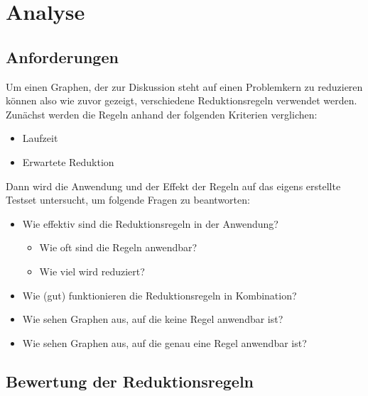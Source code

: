 
\chapter{Analyse}
\label{ch:Analyse}




\section{Anforderungen}
\label{ch:Analyse:sec:Anforderungen}

Um einen Graphen, der zur Diskussion steht auf einen Problemkern zu reduzieren können also wie zuvor gezeigt, verschiedene Reduktionsregeln verwendet werden. \\
Zunächst werden die Regeln anhand der folgenden Kriterien verglichen:
\begin{itemize}
	\item Laufzeit
	\item Erwartete Reduktion
\end{itemize}
Dann wird die Anwendung und der Effekt der Regeln auf das eigens erstellte Testset untersucht, um folgende Fragen zu beantworten:
\begin{itemize}
\item Wie effektiv sind die Reduktionsregeln in der Anwendung?
	\begin{itemize}
		\item Wie oft sind die Regeln anwendbar?
		\item Wie viel wird reduziert?
	\end{itemize}
\item Wie (gut) funktionieren die Reduktionsregeln in Kombination?
\item Wie sehen Graphen aus, auf die keine Regel anwendbar ist?
\item Wie sehen Graphen aus, auf die genau eine Regel anwendbar ist?
\end{itemize}

\section{Bewertung der Reduktionsregeln}
\label{ch:Analyse:sec:Berwertung}


